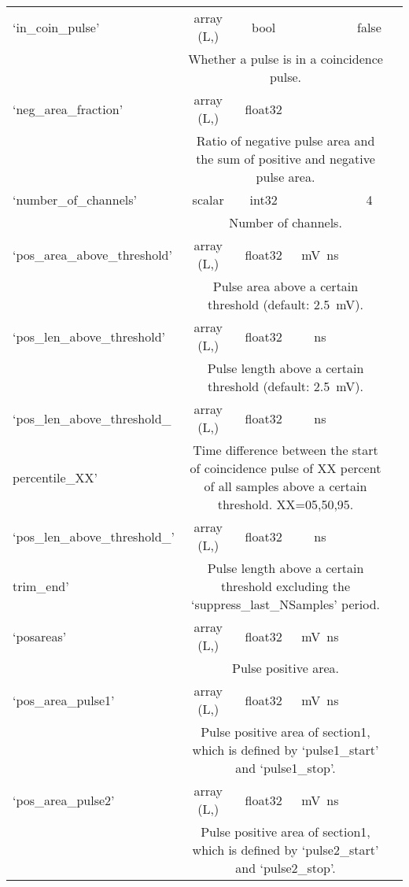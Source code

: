 \begin{center}
\begin{longtable}[!htbp]{|l||*{5}{c|}}
	 	`in\_coin\_pulse' & array (L,) & bool &  & false \\\cline{2-6} & \multicolumn{4}{m{27em}|}{Whether a pulse is in a coincidence pulse.}\\\hline
	 	`neg\_area\_fraction' & array (L,) & float32 &  & \si{\nan} \\\cline{2-6} & \multicolumn{4}{m{27em}|}{Ratio of negative pulse area and the sum of positive and negative pulse area.}\\\hline
	 	`number\_of\_channels' & scalar & int32 &  & 4 \\\cline{2-6} & \multicolumn{4}{m{27em}|}{Number of channels.}\\\hline
		
		
		
	 	`pos\_area\_above\_threshold' & array (L,) & float32 & \si{\mV\ns}&  \\\cline{2-6} & \multicolumn{4}{m{27em}|}{Pulse area above a certain threshold (default: \SI{2.5}{\mV}).}\\\hline
	 	`pos\_len\_above\_threshold' & array (L,) & float32 & \si{\ns}&  \\\cline{2-6} & \multicolumn{4}{m{27em}|}{Pulse length above a certain threshold (default: \SI{2.5}{\mV}).}\\\hline
	 	`pos\_len\_above\_threshold\_ & array (L,) & float32 & \si{\ns}&  \\\cline{2-6} percentile\_XX' & \multicolumn{4}{m{27em}|}{Time difference between the start of coincidence pulse of XX percent of all samples above a certain threshold. XX=05,50,95.}\\\hline
	 	`pos\_len\_above\_threshold\_' & array (L,) & float32 & \si{\ns}&  \\\cline{2-6} trim\_end' & \multicolumn{4}{m{27em}|}{Pulse length above a certain threshold excluding the `suppress\_last\_NSamples' period.}\\\hline
	 	`posareas' & array (L,) & float32 & \si{\mV\ns}&  \\\cline{2-6} & \multicolumn{4}{m{27em}|}{Pulse positive area. }\\\hline
	 	`pos\_area\_pulse1' & array (L,) & float32 & \si{\mV\ns}&  \\\cline{2-6} & \multicolumn{4}{m{27em}|}{Pulse positive area of section1, which is defined by `pulse1\_start' and `pulse1\_stop'. }\\\hline 
	 	`pos\_area\_pulse2' & array (L,) & float32 & \si{\mV\ns}&  \\\cline{2-6} & \multicolumn{4}{m{27em}|}{Pulse positive area of section1, which is defined by `pulse2\_start' and `pulse2\_stop'. }\\\hline 

\end{longtable}
\end{center}
